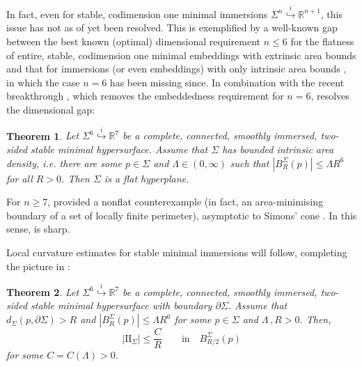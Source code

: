 \documentclass{article}
\newcommand{\R}{\mathbb{R}}
\newtheorem{theorem}{Theorem}[section]
\theoremstyle{definition}
\begin{document}
In fact, even for stable, codimension one minimal immersions $\Sigma^n\overset{i}{\hookrightarrow} \R^{n+1}$, this issue has not as of yet been resolved. This is exemplified by a well-known gap between the best known (optimal) dimensional requirement $n\leq 6$ for the flatness of entire, stable, codimension one minimal embeddings with extrinsic area bounds \cite{SS81} and that for immersions (or even embeddings) with only intrinsic area bounds \cite{SSY75}, in which the case $n=6$ has been missing since. In combination with the recent breakthrough \cite{Bel25}, which removes the embeddedness requirement for $n=6$,  resolves the dimensional gap:
\begin{theorem}\label{thm:SSYR7}
    Let $\Sigma^6\overset{i}{\hookrightarrow} \R^7$ be a complete, connected, smoothly immersed, two-sided stable minimal hypersurface. Assume that $\Sigma$ has bounded intrinsic area density, i.e. there are some $p\in\Sigma$ and $\Lambda\in(0,\infty)$ such that $|B_R^\Sigma(p)|\leq \Lambda R^6$ for all $R>0$. Then $\Sigma$ is a flat hyperplane.
\end{theorem}
For $n\geq 7$, \cite{BDGG69} provided a nonflat counterexample (in fact, an area-minimising boundary of a set of locally finite perimeter), asymptotic to Simons' cone \cite{Simons68}. In this sense,  is sharp.

Local curvature estimates for stable minimal immersions will follow, completing the picture in \cite{SSY75}:
\begin{theorem}\label{thm:curvests}
    Let $\Sigma^6\overset{i}{\hookrightarrow} \R^7$ be a complete, connected, smoothly immersed, two-sided stable minimal hypersurface with boundary $\partial \Sigma$. Assume that $d_\Sigma(p,\partial \Sigma)>R$ and $|B_R^\Sigma(p)|\leq \Lambda R^6$ for some $p\in\Sigma$ and $\Lambda\,,R>0$. Then, 
    $$|\mathrm{II}_\Sigma|\leq \frac{C}{R}\qquad \mbox{in}\quad B_{R/2}^\Sigma(p)$$
    for some $C=C(\Lambda)>0$.
\end{theorem}
\end{document}
